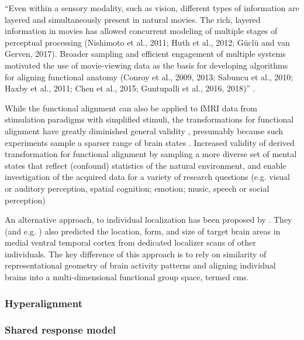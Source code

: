 %
``Even within a sensory modality, such as vision, different types of information
are layered and simultaneously present in natural movies. The rich, layered
information in movies has allowed concurrent modeling of multiple stages of
perceptual processing (Nishimoto et al., 2011; Huth et al., 2012; Güclü and van
Gerven, 2017). Broader sampling and efficient engagement of multiple systems
motivated the use of movie-viewing data as the basis for developing algorithms
for aligning functional anatomy (Conroy et al., 2009, 2013; Sabuncu et al.,
2010; Haxby et al., 2011; Chen et al., 2015; Guntupalli et al., 2016, 2018)''
\citep{haxby2020naturalistic}.

%
While the functional alignment can also be applied to fMRI data from stimulation
paradigms with simplified stimuli, the transformations for functional alignment
have greatly diminished general validity \citep{haxby2011common}, presumably
because such experiments sample a sparser range of brain states
\citep{guntupalli2016model}.
%
Increased validity of derived transformation for functional alignment by
sampling a more diverse set of mental states that reflect (confound) statistics
of the natural environment, and enable investigation of the acquired data for a
variety of research questions (e.g. visual or auditory perception, spatial
cognition; emotion; music, speech or social perception)

%
An alternative approach, to individual localization has been proposed by
\citet{haxby2011common}.
%
They (and e.g. \citet{jiahui2020predicting}) also predicted the location, form,
and size of target brain areas in medial ventral temporal cortex from dedicated
localizer scans of other individuals.
%
The key difference of this approach is to rely on similarity of representational
geometry of brain activity patterns and aligning individual brains into a
multi-dimensional functional group space, termed \ac{cms}.


\subsubsection{Hyperalignment}



\subsubsection{Shared response model}

